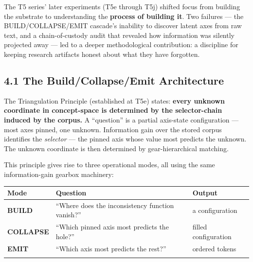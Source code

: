 \documentclass[
  twocolumn,
  10pt,
  a4paper]{article}
\newenvironment{tsxtable}{\begin{center}\footnotesize}{\end{center}}
\let\endhead\relax
\begin{document}
The T5 series' later experiments (T5e through T5j) shifted focus from
building the substrate to understanding the \textbf{process of building
it}. Two failures --- the BUILD/COLLAPSE/EMIT cascade's inability to
discover latent axes from raw text, and a chain-of-custody audit that
revealed how information was silently projected away --- led to a deeper
methodological contribution: a discipline for keeping research artifacts
honest about what they have forgotten.

\hypertarget{the-buildcollapseemit-architecture}{%
\subsection{4.1 The Build/Collapse/Emit
Architecture}\label{the-buildcollapseemit-architecture}}

The Triangulation Principle (established at T5e) states: \textbf{every
unknown coordinate in concept-space is determined by the selector-chain
induced by the corpus.} A ``question'' is a partial axis-state
configuration --- most axes pinned, one unknown. Information gain over
the stored corpus identifies the \emph{selector} --- the pinned axis
whose value most predicts the unknown. The unknown coordinate is then
determined by gear-hierarchical matching.

This principle gives rise to three operational modes, all using the same
information-gain gearbox machinery:

\begin{tsxtable}\begin{tabularx}{\linewidth}{@{}
  >{\raggedright\arraybackslash}p{}
  >{\raggedright\arraybackslash}p{}
  >{\raggedright\arraybackslash}p{}@{}}
\toprule\noalign{}
\begin{minipage}[b]{\linewidth}\raggedright
Mode
\end{minipage} & \begin{minipage}[b]{\linewidth}\raggedright
Question
\end{minipage} & \begin{minipage}[b]{\linewidth}\raggedright
Output
\end{minipage} \\
\midrule\noalign{}
\endhead
\textbf{BUILD} & ``Where does the inconsistency function vanish?'' & a
configuration \\
\textbf{COLLAPSE} & ``Which pinned axis most predicts the hole?'' &
filled configuration \\
\textbf{EMIT} & ``Which axis most predicts the rest?'' & ordered
tokens \\
\bottomrule\noalign{}
\end{tabularx}\end{tsxtable}
\end{document}
